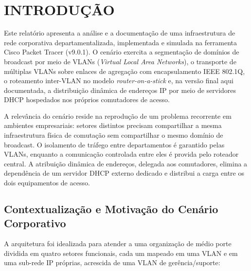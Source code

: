 \section{INTRODUÇÃO}

Este relatório apresenta a análise e a documentação de uma infraestrutura de rede
corporativa departamentalizada, implementada e simulada na ferramenta Cisco Packet
Tracer (v9.0.1). O cenário exercita a segmentação de domínios de broadcast por meio
de VLANs (\textit{Virtual Local Area Networks}), o transporte de múltiplas VLANs
sobre enlaces de agregação com encapsulamento IEEE 802.1Q, o roteamento inter-VLAN
no modelo \textit{router-on-a-stick} e, na versão final aqui documentada, a
distribuição dinâmica de endereços IP por meio de servidores DHCP hospedados nos
próprios comutadores de acesso.

A relevância do cenário reside na reprodução de um problema recorrente em ambientes
empresariais: setores distintos precisam compartilhar a mesma infraestrutura física de
comutação sem compartilhar o mesmo domínio de broadcast. O isolamento de tráfego entre
departamentos é garantido pelas VLANs, enquanto a comunicação controlada entre eles é
provida pelo roteador central. A atribuição dinâmica de endereços, delegada aos
comutadores, elimina a dependência de um servidor DHCP externo dedicado e distribui
a carga entre os dois equipamentos de acesso.

\subsection{Contextualização e Motivação do Cenário Corporativo}

A arquitetura foi idealizada para atender a uma organização de médio porte dividida
em quatro setores funcionais, cada um mapeado em uma VLAN e em uma sub-rede IP
próprias, acrescida de uma VLAN de gerência/suporte:


